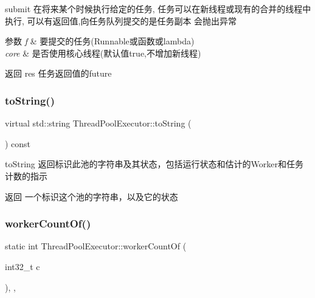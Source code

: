 submit 在将来某个时候执行给定的任务, 任务可以在新线程或现有的合并的线程中执行, 可以有返回值,向任务队列提交的是任务副本 会抛出异常 


\begin{DoxyParams}{参数}
{\em f} & 要提交的任务(Runnable或函数或lambda) \\
\hline
{\em core} & 是否使用核心线程(默认值true,不增加新线程)\\
\hline
\end{DoxyParams}
\begin{DoxyReturn}{返回}
res 任务返回值的future 
\end{DoxyReturn}
\mbox{\label{classThreadPoolExecutor_a8e340cec3bb976f7773db103d73189c2}} 
\subsubsection{\texorpdfstring{to\+String()}{toString()}}
{\footnotesize\ttfamily virtual std\+::string Thread\+Pool\+Executor\+::to\+String (\begin{DoxyParamCaption}{ }\end{DoxyParamCaption}) const\hspace{0.3cm}{\ttfamily [virtual]}}



to\+String 返回标识此池的字符串及其状态，包括运行状态和估计的\+Worker和任务计数的指示 

\begin{DoxyReturn}{返回}
一个标识这个池的字符串，以及它的状态 
\end{DoxyReturn}
\mbox{\label{classThreadPoolExecutor_af00080b50ff18ef719078b14b3df7291}} 
\subsubsection{\texorpdfstring{worker\+Count\+Of()}{workerCountOf()}}
{\footnotesize\ttfamily static int Thread\+Pool\+Executor\+::worker\+Count\+Of (\begin{DoxyParamCaption}\item[{int32\+\_\+t}]{c }\end{DoxyParamCaption})\hspace{0.3cm}{\ttfamily [inline]}, {\ttfamily [static]}, {\ttfamily [protected]}}



